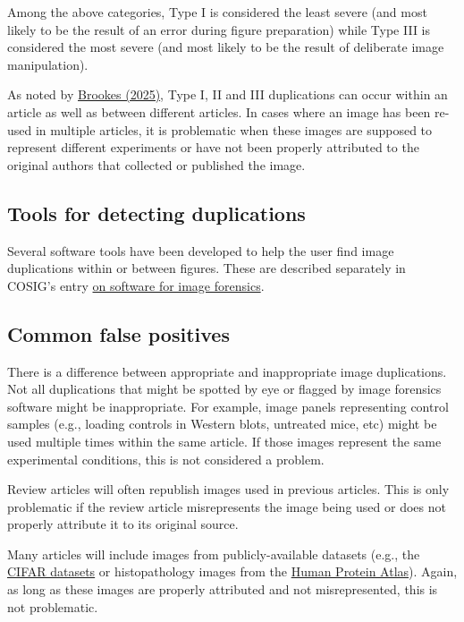 \documentclass[letterpaper, 12pt]{article}
\begin{document}
Among the above categories, Type I is considered the least severe (and most likely to be the result of an error during figure preparation) while Type III is considered the most severe (and most likely to be the result of deliberate image manipulation). 

As noted by \href{https://doi.org/10.1017/jme.2025.32}{Brookes (2025)}, Type I, II and III duplications can occur within an article as well as between different articles. In cases where an image has been re-used in multiple articles, it is problematic when these images are supposed to represent different experiments or have not been properly attributed to the original authors that collected or published the image.

\subsection*{Tools for detecting duplications}

Several software tools have been developed to help the user find image duplications within or between figures. These are described separately in COSIG's entry \href{https://osf.io/g23pf}{on software for image forensics}.

\subsection*{Common false positives}

There is a difference between appropriate and inappropriate image duplications. Not all duplications that might be spotted by eye or flagged by image forensics software might be inappropriate. For example, image panels representing control samples (e.g., loading controls in Western blots, untreated mice, etc) might be used multiple times within the same article. If those images represent the same experimental conditions, this is not considered a problem. 

Review articles will often republish images used in previous articles. This is only problematic if the review article misrepresents the image being used or does not properly attribute it to its original source.

Many articles will include images from publicly-available datasets (e.g., the \href{https://www.cs.toronto.edu/~kriz/cifar.html}{CIFAR datasets} or histopathology images from the \href{https://www.proteinatlas.org/}{Human Protein Atlas}). Again, as long as these images are properly attributed and not misrepresented, this is not problematic.
\end{document}
